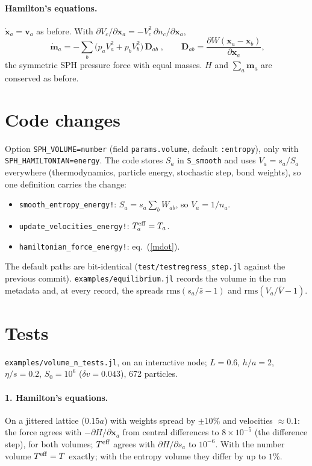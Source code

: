 \documentclass[11pt,aps,preprint,nofootinbib,superscriptaddress,tightenlines]{revtex4-2}
\def\st{\begin{equation}}
\def\stp{\end{equation}}
\def\Eq#1{eq.~(\ref{#1})}
\let\oldparagraph\paragraph
\renewcommand{\paragraph}{\par\bigskip\oldparagraph}
\begin{document}
\paragraph{Hamilton's equations.}  $\dot{\bm x}_a=\bm v_a$ as before.  With
$\partial V_c/\partial\bm x_a=-V_c^2\,\partial n_c/\partial\bm x_a$,
\st
\boxed{\;\dot{\bm m}_a=-\sum_b\big(p_aV_a^2+p_bV_b^2\big)\,\bm D_{ab}\;},
\qquad\bm D_{ab}=\frac{\partial W(\bm x_a-\bm x_b)}{\partial\bm x_a},
\label{mdot}
\stp
the symmetric SPH pressure force with equal masses.  $H$ and $\sum_a\bm m_a$ are
conserved as before.

\section{Code changes}
\label{sec:code}

Option \texttt{SPH\_VOLUME=number} (field \texttt{params.volume}, default \texttt{:entropy}),
only with \texttt{SPH\_HAMILTONIAN=energy}.  The code stores $S_a$ in
\texttt{S\_smooth} and uses $V_a=s_a/S_a$ everywhere (thermodynamics, particle energy,
stochastic step, bond weights), so one definition carries the change:
\begin{itemize}
\item \texttt{smooth\_entropy\_energy!}: $S_a=s_a\sum_bW_{ab}$, so $V_a=1/n_a$.
\item \texttt{update\_velocities\_energy!}: $T^{\rm eff}_a=T_a$.
\item \texttt{hamiltonian\_force\_energy!}: \Eq{mdot}.
\end{itemize}
The default paths are bit-identical (\texttt{test/testregress\_step.jl} against the
previous commit).  \texttt{examples/equilibrium.jl} records the volume in the
run metadata and, at every record, the spreads $\mathrm{rms}(s_a/\bar s-1)$ and
$\mathrm{rms}(V_a/\bar V-1)$.

\section{Tests}
\label{sec:tests}

\texttt{examples/volume\_n\_tests.jl}, on an interactive node; $L=0.6$, $h/a=2$,
$\eta/s=0.2$, $S_0=10^6$ ($\delta v=0.043$), 672 particles.

\paragraph{1. Hamilton's equations.}  On a jittered lattice ($0.15a$) with weights spread
by $\pm10\%$ and velocities $\approx0.1$: the force agrees with $-\partial H/\partial\bm x_a$
from central differences to $8\times10^{-5}$ (the difference step), for both volumes;
$T^{\rm eff}$ agrees with $\partial H/\partial s_a$ to $10^{-6}$.  With the number volume
$T^{\rm eff}=T$ exactly; with the entropy volume they differ by up to $1\%$.
\end{document}
